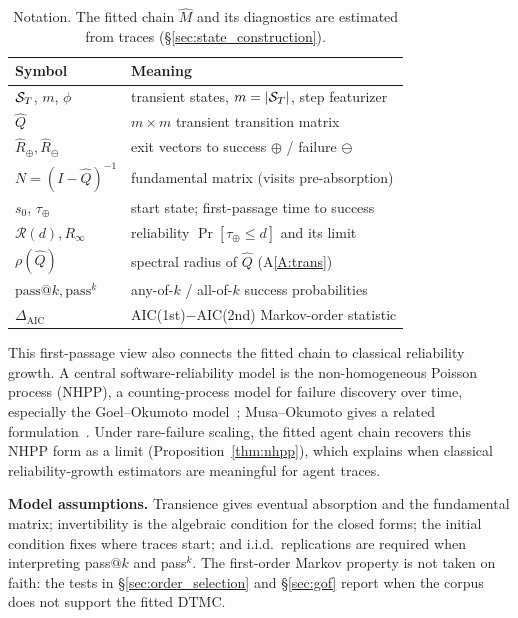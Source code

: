 \begin{table}[!t]
\centering
\caption{Notation. The fitted chain $\hat M$ and its diagnostics are
estimated from traces (\S\ref{sec:state_construction}).}
\label{tab:notation}
\small
\setlength{\tabcolsep}{4pt}
\begin{tabular}{@{}ll@{}}
\toprule
\textbf{Symbol} & \textbf{Meaning} \\
\midrule
$\mathcal{S}_T$, $m$, $\phi$ & transient states, $m=|\mathcal{S}_T|$, step featurizer \\
$\hat Q$ & $m{\times}m$ transient transition matrix \\
$\hat R_\oplus,\hat R_\ominus$ & exit vectors to success $\oplus$ / failure $\ominus$ \\
$N{=}(I{-}\hat Q)^{-1}$ & fundamental matrix (visits pre-absorption) \\
$s_0$, $\tau_\oplus$ & start state; first-passage time to success \\
$\mathcal R(d),R_\infty$ & reliability $\Pr[\tau_\oplus\!\le\! d]$ and its limit \\
$\rho(\hat Q)$ & spectral radius of $\hat Q$ (A\ref{A:trans}) \\
$\mathrm{pass}@k,\mathrm{pass}^k$ & any-of-$k$ / all-of-$k$ success probabilities \\
$\Delta_{\mathrm{AIC}}$ & AIC(1st)$-$AIC(2nd) Markov-order statistic \\
\bottomrule
\end{tabular}
\end{table}

This first-passage view also connects the fitted chain to classical
reliability growth. A central software-reliability model is the
non-homogeneous Poisson process (NHPP), a counting-process model for
failure discovery over time, especially the Goel--Okumoto
model~\cite{goelokt}; Musa--Okumoto gives a related formulation~\cite{musa1987}.
Under rare-failure scaling, the fitted agent chain recovers this NHPP
form as a limit (Proposition~\ref{thm:nhpp}), which explains when
classical reliability-growth estimators are meaningful for agent traces.

\noindent\textbf{Model assumptions.}
Transience gives eventual absorption and the fundamental matrix;
invertibility is the algebraic condition for the closed forms; the
initial condition fixes where traces start; and i.i.d.\ replications are
required when interpreting pass$@k$ and pass$^k$. The first-order Markov
property is not taken on faith: the tests in
\S\ref{sec:order_selection} and \S\ref{sec:gof} report when the corpus
does not support the fitted DTMC.

